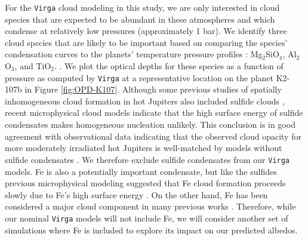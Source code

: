 \documentclass[twocolumn]{aastex63}
\begin{document}
For the \texttt{Virga} cloud modeling in this study, we are only interested in cloud species that are expected to be abundant in these atmospheres and which condense at relatively low pressures (approximately 1 bar).  We identify three cloud species that are likely to be important based on comparing the species' condensation curves to the planets' temperature pressure profiles \citep[Figure~\ref{fig:TCondens}; also see][]{ackerman2001,morley2012}: Mg$_2$SiO$_4$, Al$_2$O$_3$, and TiO$_2$. \color{black}{This assumes that all SiO goes into Mg$_2$SiO$_4$ rather than SiO$_2$ or MgSiO$_3$. The inclusion of SiO$_2$ would require a different modeling framework including kinetic condensation}. \color{black}We plot the optical depths \color{black}{in the Kepler bandpass (shown in Figure 6)} \color{black} for these species as a function of pressure as computed by \texttt{Virga} at a representative location on the planet K2-107b in Figure \ref{fig:OPD-K107}. Although some previous studies of spatially inhomogeneous cloud formation in hot Jupiters also included sulfide clouds \citep[e.g.][]{parmentier2016}, recent microphysical cloud models  \citep[][]{Powell_2019,gao2020} indicate that the high surface energy of sulfide condensates makes homogeneous nucleation unlikely. This conclusion is in good agreement with observational data indicating that the observed cloud opacity for more moderately irradiated hot Jupiters is well-matched by models without sulfide condensates \citep[e.g.][]{chachan2019,gao2020}. We therefore exclude sulfide condensates from our \texttt{Virga} models. Fe is also a potentially important condensate, but like the sulfides previous microphysical modeling suggested that Fe cloud formation proceeds slowly due to Fe's high surface energy \citep[][]{gao2020}. On the other hand, Fe has been considered a major cloud component in many previous works \citep[][]{marley2013,helling2008,marley2015,fortney2005,sudarsky2003}. Therefore, while our nominal \texttt{Virga} models will not include Fe, we will consider another set of simulations where Fe is included to explore its impact on our predicted albedos.  


\end{document}
